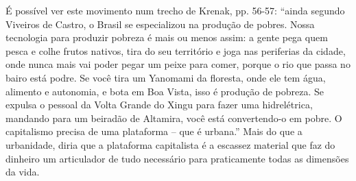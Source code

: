 É possível ver este movimento num trecho de Krenak, pp. 56-57: \enquote{ainda segundo Viveiros de Castro, o Brasil se especializou na produção de pobres. Nossa tecnologia para produzir pobreza é mais ou menos assim: a gente pega quem pesca e colhe frutos nativos, tira do seu território e joga nas periferias da cidade, onde nunca mais vai poder pegar um peixe para comer, porque o rio que passa no bairo está podre. Se você tira um Yanomami da floresta, onde ele tem água, alimento e autonomia, e bota em Boa Vista, isso é produção de pobreza. Se expulsa o pessoal da Volta Grande do Xingu para fazer uma hidrelétrica, mandando para um beiradão de Altamira, você está convertendo-o em pobre. O capitalismo precisa de uma plataforma -- que é urbana.} Mais do que a urbanidade, diria que a plataforma capitalista é a escassez material que faz do dinheiro um articulador de tudo necessário para praticamente todas as dimensões da vida.
